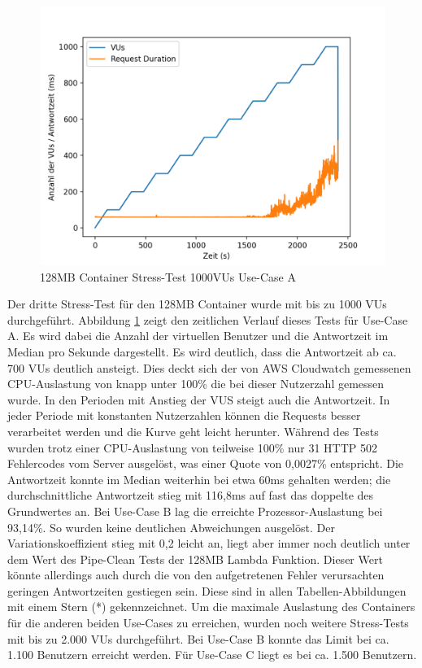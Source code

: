 \begin{figure}[H]
    \includegraphics[width=\textwidth]{img/fargate128-stress1000.png}
    \caption[Container Stress-Test 1000VUs]{128MB Container Stress-Test 1000VUs Use-Case A}
    \label{fig:fargate128-stress1000}
\end{figure}

Der dritte Stress-Test für den 128MB Container wurde mit bis zu 1000 VUs durchgeführt. Abbildung \ref{fig:fargate128-stress1000} zeigt den zeitlichen Verlauf dieses Tests für Use-Case A. Es wird dabei die Anzahl der virtuellen Benutzer und die Antwortzeit im Median pro Sekunde dargestellt. Es wird deutlich, dass die Antwortzeit ab ca. 700 VUs deutlich ansteigt. Dies deckt sich der von AWS Cloudwatch gemessenen CPU-Auslastung von knapp unter 100\% die bei dieser Nutzerzahl gemessen wurde. In den Perioden mit Anstieg der VUS steigt auch die Antwortzeit. In jeder Periode mit konstanten Nutzerzahlen können die Requests besser verarbeitet werden und die Kurve geht leicht herunter. Während des Tests wurden trotz einer CPU-Auslastung von teilweise 100\% nur 31 HTTP 502 Fehlercodes vom Server ausgelöst, was einer Quote von 0,0027\% entspricht. Die Antwortzeit konnte im Median weiterhin bei etwa 60ms gehalten werden; die durchschnittliche Antwortzeit stieg mit 116,8ms auf fast das doppelte des Grundwertes an.  
Bei Use-Case B lag die erreichte Prozessor-Auslastung bei 93,14\%. So wurden keine deutlichen Abweichungen ausgelöst. Der Variationskoeffizient stieg mit 0,2 leicht an, liegt aber immer noch deutlich unter dem Wert des Pipe-Clean Tests der 128MB Lambda Funktion. Dieser Wert könnte allerdings auch durch die von den aufgetretenen Fehler verursachten geringen Antwortzeiten gestiegen sein. Diese sind in allen Tabellen-Abbildungen mit einem Stern (*) gekennzeichnet.
Um die maximale Auslastung des Containers für die anderen beiden Use-Cases zu erreichen, wurden noch weitere Stress-Tests mit bis zu 2.000 VUs durchgeführt. Bei Use-Case B konnte das Limit bei ca. 1.100 Benutzern erreicht werden. Für Use-Case C liegt es bei ca. 1.500 Benutzern.

